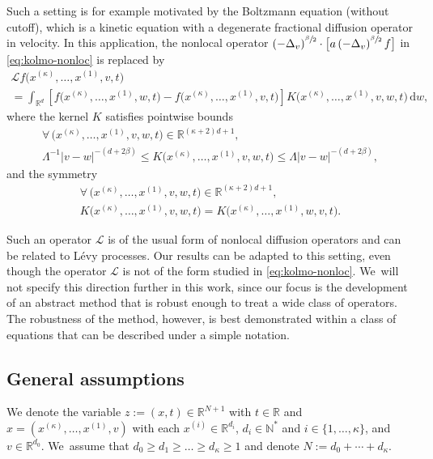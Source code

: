 \documentclass[JEP,XML,SOM,Unicode,NoFloatCountersInSection,published]{cedram}
\theoremstyle{definition}
\newcommand\N{{\mathbb N}}
\newcommand\R{{\mathbb R}}
\newcommand{\dd}{{\, \mathrm d}}
\begin{document}
Such a setting is for example motivated by the Boltzmann equation (without
cutoff), which is a kinetic equation with a degenerate fractional diffusion
operator in velocity. In this application, the nonlocal operator
$\left(- \Delta_v \right)^{\sfrac{\beta}{2}} \cdot \bigl[ a \left(- \Delta_v \right)^{\sfrac{\beta}{2}} f \bigr]$
in \eqref{eq:kolmo-nonloc} is replaced by
\begin{multline*}
\mathcal L f\bigl(x^{(\kappa)},\dots,x^{(1)},v,t\bigr) \\
= \int_{\R^d} \left[ f\bigl(x^{(\kappa)},\dots,
x^{(1)},w,t\bigr) -f\bigl(x^{(\kappa)},\dots,x^{(1)},v,t
\bigr) \right]
K\bigl(x^{(\kappa)},\dots,x^{(1)},v,w,t\bigr) \dd w,
\end{multline*}
where the kernel $K$ satisfies pointwise bounds
\begin{multline}
\forall \, \bigl(x^{(\kappa)},\dots,x^{(1)},v,w,t\bigr)
\in \R^{(\kappa+2)d+1}, \\
\label{eq:elliptic-nonloc}
\Lambda^{-1} \big\vert v - w\big\vert^{-(d+2\beta)} \leq
K\bigl(x^{(\kappa)},\dots,x^{(1)},v,w,t\bigr) \leq \Lambda
\big\vert v - w\big\vert^{-(d+2\beta)},
\end{multline}
and the symmetry
\begin{multline}
\forall \, \bigl(x^{(\kappa)},\dots,x^{(1)},v,w,t\bigr)
\in \R^{(\kappa+2)d+1},\\
\label{eq:symmetry-nonloc}
K\bigl(x^{(\kappa)},\dots,x^{(1)},v,w,t\bigr) =
K\bigl(x^{(\kappa)},\dots,x^{(1)},w,v,t\bigr).
\end{multline}

Such an operator \(\mathcal L\) is of the usual form of nonlocal diffusion
operators and can be related to Lévy processes. Our results can be adapted to
this setting, even though the operator \(\mathcal L\) is not of the form studied
in \eqref{eq:kolmo-nonloc}. We~will not specify this direction further in this
work, since our focus is the development of an abstract method that is robust
enough to treat a wide class of operators. The robustness of the method,
however, is best demonstrated within a class of equations that can be described
under a simple notation.

\subsection{General assumptions}\label{subsec:H}
We denote the variable $z:=(x,t) \in \R^{N+1}$ with $t \in \R$ and
$x=(x^{(\kappa)},\dots,x^{(1)},v)$ with each
$x^{(i)} \in \R^{d_i}$, $d_i \in \N^*$ and
$i \in \{1,\dots,\kappa\}$, and $v \in \R^{d_0}$. We~assume that
$d_0 \geq d_1 \geq \dots \geq d_{\kappa}\geq 1$ and denote
$N:=d_0+\cdots+d_\kappa$.
\end{document}
